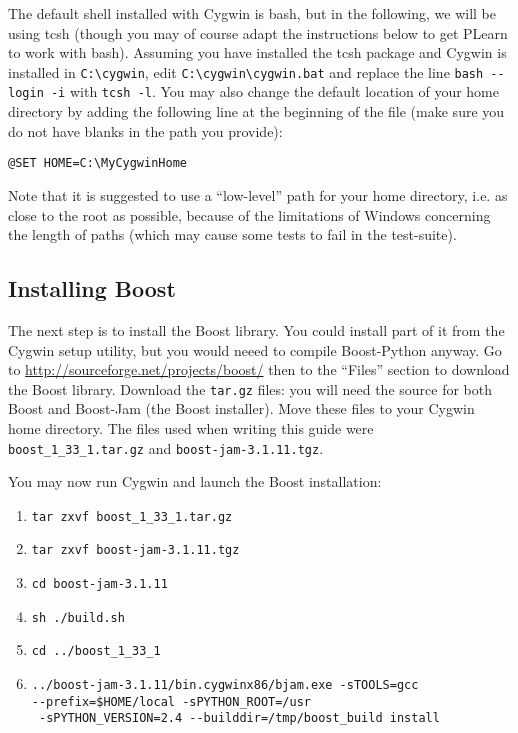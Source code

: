 \documentclass[11pt]{book}
\begin{document}
The default shell installed with Cygwin is bash, but in the following, we will
be using tcsh (though you may of course adapt the instructions below to get PLearn to
work with bash). Assuming you have installed the tcsh package and Cygwin is
installed in \verb!C:\cygwin!, edit \verb!C:\cygwin\cygwin.bat! and replace
the line \verb!bash --login -i! with \verb!tcsh -l!.
You may also change the default location of your home directory by adding the
following line at the beginning of the file (make sure you do not have blanks
in the path you provide):
\begin{verbatim}
@SET HOME=C:\MyCygwinHome
\end{verbatim}

Note that it is suggested to use a ``low-level'' path for your home directory, i.e. as close
to the root as possible, because of the limitations of Windows concerning the
length of paths (which may cause some tests to fail in the test-suite).

\subsection{Installing Boost}
The next step is to install the Boost library.
You could install part of it from the Cygwin setup utility, but you would
neeed to compile Boost-Python anyway.
Go to \url{http://sourceforge.net/projects/boost/} then to the ``Files'' section
to download
the Boost library. Download the \verb!tar.gz! files:
you will need the source for both Boost and Boost-Jam (the Boost installer).
Move these files to your Cygwin home directory.
The files used when writing this guide were \verb!boost_1_33_1.tar.gz!
and \verb!boost-jam-3.1.11.tgz!.

You may now run Cygwin and launch the Boost installation:
\begin{enumerate}
\item \verb!tar zxvf boost_1_33_1.tar.gz!
\item \verb!tar zxvf boost-jam-3.1.11.tgz!
\item \verb!cd boost-jam-3.1.11!
\item \verb!sh ./build.sh!
\item \verb!cd ../boost_1_33_1!
\item \verb!../boost-jam-3.1.11/bin.cygwinx86/bjam.exe -sTOOLS=gcc! \\
\verb!--prefix=$HOME/local -sPYTHON_ROOT=/usr! \\
\verb! -sPYTHON_VERSION=2.4 --builddir=/tmp/boost_build install!
\end{enumerate}
\end{document}
